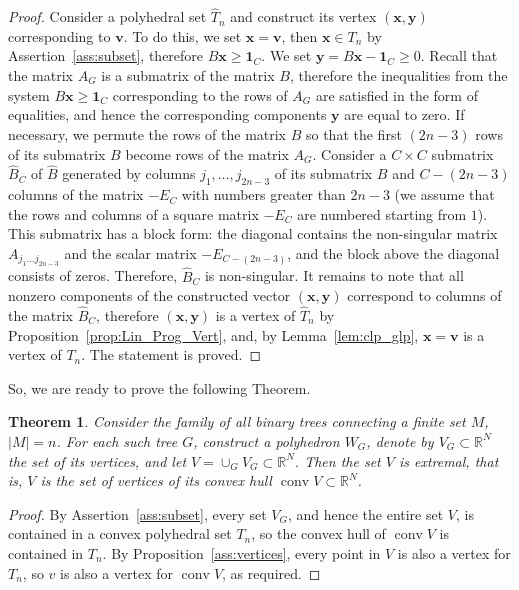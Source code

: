 \documentclass[10pt]{article}
\theoremstyle{plain}
\newtheorem*{thh}{Theorem}
\theoremstyle{definition}
\def\one{\mathbf{1}}
\def\bv{\boldsymbol{v}}
\def\bx{\boldsymbol{x}}
\def\by{\boldsymbol{y}}
\def\conv{\operatorname{conv}}
\def\hB{{\widehat{B}}}
\def\hT{{\widehat{T}}}
\newcommand{\R}{{\mathbb R}}
\begin{document}
\begin{proof}
Consider a polyhedral set $\hT_n$ and construct its vertex $(\bx,\by)$ corresponding to $\bv$. To do this, we set $\bx=\bv$, then $\bx\in T_n$ by Assertion~\ref{ass:subset}, therefore $B\bx\ge\one_C$. We set $\by=B\bx-\one_C\ge0$. Recall that the matrix $A_G$ is a submatrix of the matrix $B$, therefore the inequalities from the system $B\bx\ge\one_{C}$ corresponding to the rows of $A_G$ are satisfied in the form of equalities, and hence the corresponding components $\by$ are equal to zero. If necessary, we permute the rows of the matrix $\hB$ so that the first $(2n-3)$ rows of its submatrix $B$ become rows of the matrix $A_G$. Consider a $C\times C$ submatrix $\hB_C$ of $\hB$ generated by columns $j_1,\ldots,j_{2n-3}$ of its submatrix $B$ and $C-(2n-3)$ columns of the matrix $-E_C$ with numbers greater than $2n-3$ (we assume that the rows and columns of a square matrix $-E_C$ are numbered starting from $1$). This submatrix has a block form: the diagonal contains the non-singular matrix $A_{j_1\ldots j_{2n-3}}$ and the scalar matrix $-E_{C-(2n-3)}$, and the block above the diagonal consists of zeros. Therefore, $\hB_C$ is non-singular. It remains to note that all nonzero components of the constructed vector $(\bx,\by)$ correspond to columns of the matrix $\hB_C$, therefore $(\bx,\by)$ is a vertex of $\hT_n$ by Proposition~\ref{prop:Lin_Prog_Vert}, and, by Lemma~\ref{lem:clp_glp}, $\bx=\bv$ is a vertex of $T_n$. The statement is proved.
\end{proof}

So, we are ready to prove the following Theorem.

\begin{thh}\label{thm:all_conv}
Consider the family of all binary trees connecting a finite set $M$, $|M|=n$. For each such tree $G$, construct a polyhedron $W_G$, denote by $V_G\subset\R^N$ the set of its vertices, and let $V=\cup_GV_G\subset\R^N$. Then the set $V$ is extremal, that is, $V$ is the set of vertices of its convex hull $\conv V\subset\R^N$.
\end{thh}

\begin{proof}
By Assertion~\ref{ass:subset}, every set $V_G$, and hence the entire set $V$, is contained in a convex polyhedral set $T_n$, so the convex hull of $\conv V$ is contained in $T_n$. By Proposition~\ref{ass:vertices}, every point in $V$ is also a vertex for $T_n$, so $v$ is also a vertex for $\conv V$, as required.
\end{proof}

\end{document}
